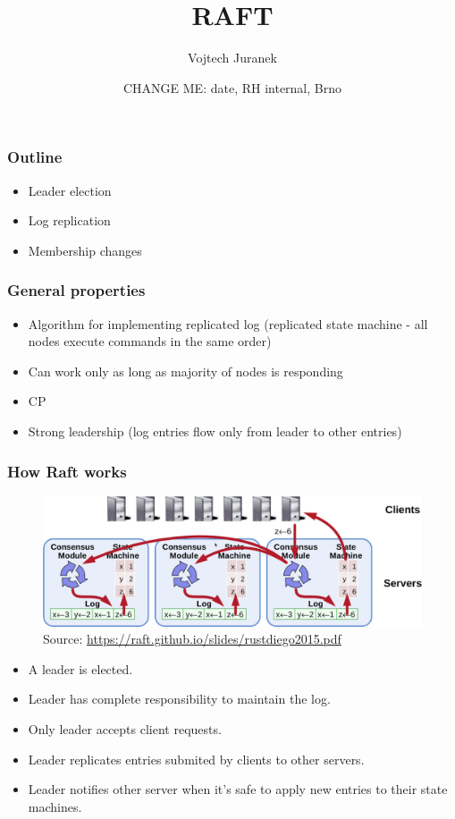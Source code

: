 \documentclass[10pt,utf8]{beamer}
\title{RAFT}
\author{Vojtech Juranek}
\institute[Red Hat]{JBoss - a division by Red Hat}
\date{CHANGE ME: date, RH internal, Brno}
\begin{document}
\begin{frame}
 \titlepage
\end{frame}


\begin{frame}
  \frametitle{Outline}
  \begin{itemize}
    \item Leader election
		\item Log replication
		\item Membership changes
  \end{itemize}
\end{frame}


\begin{frame}
  \frametitle{General properties}
	\begin{itemize}
		\item Algorithm for implementing replicated log (replicated state machine - all nodes execute commands in the same order)
		\item Can work only as long as majority of nodes is responding
		\item CP
		\item Strong leadership (log entries flow only from leader to other entries)
	\end{itemize}
\end{frame}

\begin{frame}
	\frametitle{How Raft works}
	\begin{figure}
		\centering
		\includegraphics[width=12cm]{./img/log_repl.eps}
		\caption{\tiny{Source: \url{https://raft.github.io/slides/rustdiego2015.pdf}}}
	\end{figure}
	\begin{itemize}
		\item A leader is elected.
		\item Leader has complete responsibility to maintain the log.
		\item Only leader accepts client requests.
		\item Leader replicates entries submited by clients to other servers.
		\item Leader notifies other server when it's safe to apply new entries to their state machines.
	\end{itemize}
\end{frame}
\end{document}
